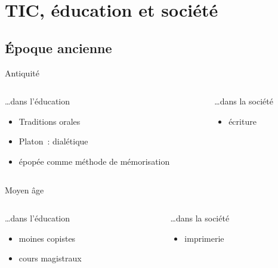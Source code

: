
\section{TIC, éducation et société}

\subsection{Époque ancienne}

\begin{frame}{Antiquité}
\begin{columns}
\begin{column}{0.49\linewidth}
\ldots dans l'éducation
\begin{itemize}
\item Traditions orales
\item Platon~: dialétique
\item épopée comme méthode de mémorisation
\end{itemize}
\end{column}

\begin{column}{0.49\linewidth}
\ldots dans la société
\begin{itemize}
\item écriture
\end{itemize}
\end{column}
\end{columns}
\end{frame}

\begin{frame}{Moyen âge}
\begin{columns}
\begin{column}{0.49\linewidth}
\ldots dans l'éducation
\begin{itemize}
\item moines copistes
\item cours magistraux
\end{itemize}
\end{column}

\begin{column}{0.49\linewidth}
\ldots dans la société
\begin{itemize}
\item imprimerie
\end{itemize}
\end{column}
\end{columns}
\end{frame}

